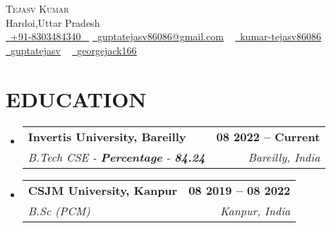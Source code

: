 \documentclass[letterpaper,11pt]{article}
\makeatletter
\newcommand{\resumeSubheading}[4]{
  \vspace{-2pt}\item
    \begin{tabular*}{1.0\textwidth}[t]{l@{\extracolsep{\fill}}r}
      \textbf{\large#1} & \textbf{\small #2} \\
      \textit{\large#3} & \textit{\small #4} \\
     
    \end{tabular*}\vspace{-7pt}
}
\newcommand{\resumeSubHeadingListStart}{\begin{itemize}[leftmargin=0.0in, label={}]}
\newcommand{\resumeSubHeadingListEnd}{\end{itemize}}
\makeatother
\begin{document}




\begin{center}
    {\Huge \scshape Tejasv Kumar} \\ \vspace{1pt}
    Hardoi,Uttar Pradesh \\ \vspace{1pt}
    \small \href{tel:+xxxxxxxxxxxx}{ \raisebox{-0.1\height}\faPhone\ \underline{+91-8303484340} ~} \href{mailto:guptatejasv86086@gmail.com}{\raisebox{-0.2\height}\faEnvelope\  \underline{guptatejasv86086@gmail.com}} ~
    \href{https://www.linkedin.com/in/kumar-tejasv86086}{\raisebox{-0.2\height}\faLinkedinSquare\ \underline{kumar-tejasv86086}}  ~
    \href{https://github.com/guptatejasv}{\raisebox{-0.2\height}\faGithub\ \underline{guptatejasv}} ~
    \href{https://www.hackerrank.com/profile/georgejack166}{\raisebox{-0.2\height}\faHackerrank\ \underline{georgejack166}} ~
\end{center}




\section{EDUCATION}
  \resumeSubHeadingListStart
    \resumeSubheading
      {Invertis University, Bareilly}{08 2022 -- Current}
      {B.Tech CSE - \textbf{Percentage} - \textbf{84.24}}{Bareilly, India}
  \resumeSubHeadingListEnd
 
  \resumeSubHeadingListStart
    \resumeSubheading
      {CSJM University, Kanpur}{08 2019 -- 08 2022}
      {B.Sc (PCM)\textbf \textbf{}}{Kanpur, India}
  \resumeSubHeadingListEnd

  


\end{document}
